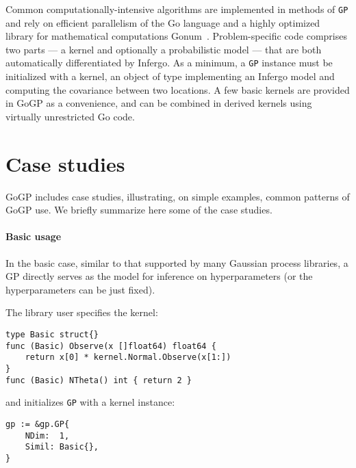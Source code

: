 \documentclass[sigplan,review]{acmart}\settopmatter{printfolios=true,printccs=false,printacmref=false}
\begin{document}
Common computationally-intensive algorithms are implemented in 
methods of \lstinline{GP} and rely on efficient parallelism of
the Go language and a highly optimized library for mathematical 
computations Gonum~\cite{Gonum}. Problem-specific code comprises two
parts --- a kernel and optionally a probabilistic model --- that
are both automatically differentiated by Infergo.  As a minimum,
a \lstinline{GP} instance must be initialized with a kernel, an
object of type implementing an Infergo model and computing the
covariance between two locations. A few basic kernels are
provided in GoGP as a convenience, and can be combined in derived
kernels using virtually unrestricted Go code. 

% 

\section{Case studies}

GoGP includes case studies, illustrating, on simple examples,
common patterns of GoGP use. We briefly summarize here some
of the case studies.

\paragraph{Basic usage}

In the basic case, similar to that supported by many Gaussian
process libraries, a GP directly serves as the model for
inference on hyperparameters (or the hyperparameters can be just
fixed).

The library user specifies the kernel:
\begin{lstlisting}
type Basic struct{}
func (Basic) Observe(x []float64) float64 {
    return x[0] * kernel.Normal.Observe(x[1:])
}
func (Basic) NTheta() int { return 2 }
\end{lstlisting}
and initializes \lstinline{GP} with a kernel instance:
\begin{lstlisting}
gp := &gp.GP{
    NDim:  1,
    Simil: Basic{},
}
\end{lstlisting}
\end{document}
